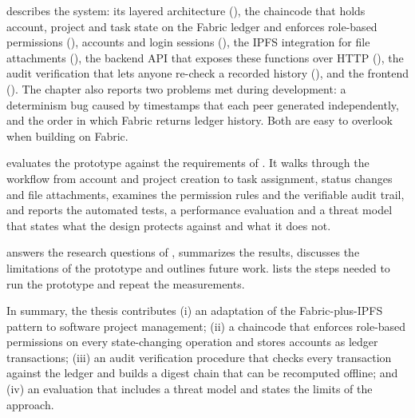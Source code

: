  describes the system: its layered architecture (), the chaincode that holds account, project and task state on the Fabric ledger and enforces role-based permissions (), accounts and login sessions (), the IPFS integration for file attachments (), the backend API that exposes these functions over HTTP (), the audit verification that lets anyone re-check a recorded history (), and the frontend (). The chapter also reports two problems met during development: a determinism bug caused by timestamps that each peer generated independently, and the order in which Fabric returns ledger history. Both are easy to overlook when building on Fabric.

 evaluates the prototype against the requirements of . It walks through the workflow from account and project creation to task assignment, status changes and file attachments, examines the permission rules and the verifiable audit trail, and reports the automated tests, a performance evaluation and a threat model that states what the design protects against and what it does not.

 answers the research questions of , summarizes the results, discusses the limitations of the prototype and outlines future work.  lists the steps needed to run the prototype and repeat the measurements.

In summary, the thesis contributes (i) an adaptation of the Fabric-plus-IPFS pattern to software project management; (ii) a chaincode that enforces role-based permissions on every state-changing operation and stores accounts as ledger transactions; (iii) an audit verification procedure that checks every transaction against the ledger and builds a digest chain that can be recomputed offline; and (iv) an evaluation that includes a threat model and states the limits of the approach.
